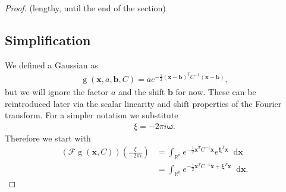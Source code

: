 \documentclass{paper}
\newcommand{\F}{\ensuremath{\mathcal{F}}}
\newcommand{\vr}[1]{\ensuremath{\boldsymbol{#1}}}
\newcommand{\f}[1]{\operatorname{#1}}
\newcommand*\diff{\mathop{}\!\mathrm{d}}
\newcommand{\omegavec}[0]{\ensuremath{\vr{\omega{}}}}
\begin{document}
\begin{proof} (lengthy, until the end of the section)
\subsection*{Simplification}
We defined a Gaussian as 
\begin{align*}
	\f{g}(\vr{x}, a, \vr{b}, C) = a e^{-\frac{1}{2}(\vr{x}-\vr{b})^T C^{-1}(\vr{x}-\vr{b})},
\end{align*}
but we will ignore the factor $a$ and the shift $\vr{b}$ for now.
These can be reintroduced later via the scalar linearity and shift properties of the Fourier transform.
For a simpler notation we substitute
\begin{align*}
	\xi = -2 \pi i \omegavec.
\end{align*}
Therefore we start with
\begin{align*}
	(\F\f{g}(\vr{x}, C))(\frac{\xi}{-2 \pi i}) &= \int_{\mathbb{R}^n} e^{-\frac{1}{2} \vr{x}^T C^{-1} \vr{x}} e^{\vr{\xi}^T \vr{x}} \diff \vr{x} \\
	&= \int_{\mathbb{R}^n} e^{-\frac{1}{2} \vr{x}^T C^{-1} \vr{x} + \vr{\xi}^T \vr{x}} \diff \vr{x}.
\end{align*}


\end{proof}
\end{document}

